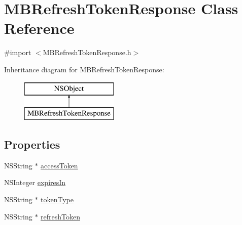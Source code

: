 \hypertarget{interface_m_b_refresh_token_response}{\section{M\-B\-Refresh\-Token\-Response Class Reference}
\label{interface_m_b_refresh_token_response}
}


{\ttfamily \#import $<$M\-B\-Refresh\-Token\-Response.\-h$>$}

Inheritance diagram for M\-B\-Refresh\-Token\-Response\-:\begin{figure}[H]
\begin{center}
\leavevmode
\includegraphics[height=2.000000cm]{interface_m_b_refresh_token_response}
\end{center}
\end{figure}
\subsection*{Properties}
\begin{DoxyCompactItemize}
\item 
N\-S\-String $\ast$ \hyperlink{interface_m_b_refresh_token_response_aae7d6df5c0e6da13e80b3ddb82ae7081}{access\-Token}
\item 
N\-S\-Integer \hyperlink{interface_m_b_refresh_token_response_ae251d07feaa95423629811e829c40f0a}{expires\-In}
\item 
N\-S\-String $\ast$ \hyperlink{interface_m_b_refresh_token_response_aebb1b1ab373299d1bbcb8edacfc117c2}{token\-Type}
\item 
N\-S\-String $\ast$ \hyperlink{interface_m_b_refresh_token_response_a52a523200e9ed6203d66dc7250c725dd}{refresh\-Token}
\end{DoxyCompactItemize}


